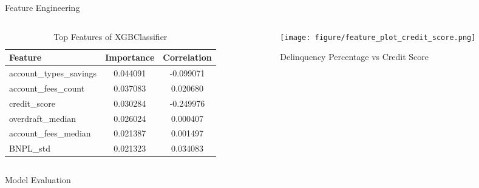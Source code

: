\documentclass[final]{beamer}
\newlength{\colwidth}
\begin{document}
\begin{frame}[t]
\begin{columns}[t]
\begin{column}{\colwidth}
\begin{block}{Feature Engineering}
\begin{columns}
    \begin{column}{0.5\textwidth}
        \begin{table}[H]
        \centering
        \begin{tabular}{|l|c|c|}
            \hline
            Feature & Importance & Correlation \\
            \hline
            account\_types\_savings & 0.044091 & -0.099071 \\
            account\_fees\_count & 0.037083 & 0.020680 \\
            credit\_score & 0.030284 & -0.249976 \\
            overdraft\_median & 0.026024 & 0.000407 \\
            account\_fees\_median & 0.021387 & 0.001497 \\
            BNPL\_std & 0.021323 & 0.034083 \\
            \hline
        \end{tabular}
        \caption{Top Features of XGBClassifier}
        \label{tab:top_features_xgb}
    \end{table}
    \end{column}

    \begin{column}{0.5\textwidth}
        \begin{figure}[H]
        \texttt{[image: figure/feature\_plot\_credit\_score.png]}
        \caption{Delinquency Percentage vs Credit Score}
        \label{fig:feature_plot_credit_score}
    \end{figure}
    \end{column}
\end{columns}

  \end{block}

  \begin{block}{Model Evaluation}


\end{block}
\end{column}
\end{columns}
\end{frame}
\end{document}
